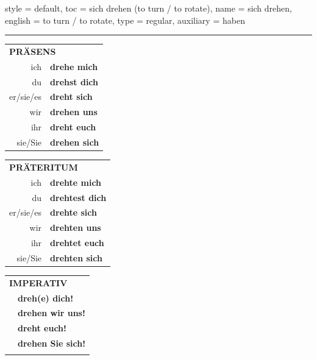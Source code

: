 \begin{verbentry}{
  style = {default},
  toc = {sich drehen (to turn / to rotate)},
  name = {sich drehen},
  english = {to turn / to rotate},
  type = {regular},
  auxiliary = {haben}
}
 
    
     \vspace{5pt}

    \hrule
    
    \vspace{5pt}

  \begin{tabular}{rl}
     \multicolumn{2}{l}{\textbf{PRÄSENS} }\\
    ich & \textbf{drehe mich}\\
    du & \textbf{drehst dich}\\
    er/sie/es & \textbf{dreht sich}\\
    wir & \textbf{drehen uns}\\
    ihr & \textbf{dreht euch}\\
    sie/Sie & \textbf{drehen sich}\\
  \end{tabular}
  \hfill
     \begin{tabular}{rl}
    \multicolumn{2}{l}{\textbf{PRÄTERITUM} }\\
    ich & \textbf{drehte mich}\\
    du & \textbf{drehtest dich}\\
    er/sie/es & \textbf{drehte sich}\\
    wir & \textbf{drehten uns}\\
    ihr & \textbf{drehtet euch}\\
    sie/Sie & \textbf{drehten sich}\\
  \end{tabular}
  \hfill
  \begin{tabular}{rl}
     \multicolumn{2}{l}{\textbf{IMPERATIV} }\\
   & \textbf{dreh(e) dich!}\\
   & \textbf{drehen wir uns!}\\
   & \textbf{dreht euch!}\\
   & \textbf{drehen Sie sich!}\\
   & \vspace{10pt}
  \end{tabular}

    \vspace{10pt}


\end{verbentry}
